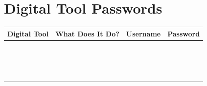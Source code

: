 \documentclass{tufte-handout}
\begin{document}


\newpage

\section{Digital Tool Passwords}

\begin{tabular}{p{1.25in}p{1.5in}p{1.5in}p{1.5in}}
	\toprule
	Digital Tool & What Does It Do? & Username & Password \\
	\midrule\midrule
	& \Huge  &  &  &  \\
	\midrule
	& \Huge  &  &  &  \\
	\midrule
	& \Huge  &  &  &  \\
	\midrule
	& \Huge  &  &  &  \\
	\midrule
	& \Huge  &  &  &  \\
	\midrule
	& \Huge  &  &  &  \\
	\midrule
	& \Huge  &  &  &  \\
	\midrule
	& \Huge  &  &  &  \\
	\midrule
	& \Huge  &  &  &  \\
	\midrule
	& \Huge  &  &  &  \\
	\midrule
	& \Huge  &  &  &  \\
	\midrule
	& \Huge  &  &  &  \\
	\midrule
	& \Huge  &  &  &  \\
	\midrule
	& \Huge  &  &  &  \\
	\midrule
	& \Huge  &  &  &  \\
	\midrule
	& \Huge  &  &  &  \\
	\bottomrule
\end{tabular}
\end{document}
